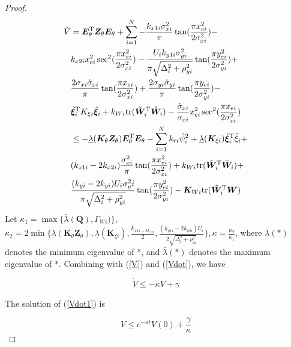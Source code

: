\documentclass[english]{cccconf}
\begin{document}
\begin{proof}
\begin{equation}\label{Vdot}
	\begin{aligned}
		\dot{V}&=\bm{E}^{\rm T}_\theta \bm{Z}_\theta \bm{E}_\theta+\sum^N_{i=1}-\frac{k_{x1i}\sigma^2_{xi}}{\pi}\tan(\frac{\pi x^2_{ei}}{2\sigma^2_{xi}})-\\
		&k_{x2i}x^2_{ei}\sec^2(\frac{\pi x^2_{ei}}{2\sigma^2_{xi}})-\frac{U_ik_{y1i}\sigma^2_{yi}}{\pi\sqrt{\Delta^2_i+\rho^2_{yi}}}\tan(\frac{\pi y^2_{ei}}{2\sigma^2_{yi}})+\\
		&\frac{2\sigma_{xi}\dot{\sigma}_{xi}}{\pi}\tan(\frac{\pi x_{ei}}{2\sigma^2_{xi}})+\frac{2\sigma_{yi}\dot{\sigma}_{yi}}{\pi}\tan(\frac{\pi y_{ei}}{2\sigma^2_{yi}})-\\
		&\tilde{\bm{\xi}}^{\rm T}_iK_{\xi i}\tilde{\bm{\xi}}_i+k_{Wi}{\rm tr}(\tilde{\bm{W}}^{\rm T}_i\hat{\bm{W}}_i)-\frac{\dot{\sigma}_{xi}}{\sigma_{xi}}x^2_{ei}\sec^2(\frac{\pi x_{ei}}{2\sigma^2_{xi}})\\
		&\leq -\underline{\lambda}(\bm{K}_\theta \bm{Z}_\theta)\bm{E}^{\rm T}_\theta \bm{E}_\theta-\sum^N_{i=1}k_{ri}\tilde{\psi}^2_i+\underline{\lambda}(\bm{K}_{\xi i})\tilde{\bm{\xi}}^{\rm T}_i\tilde{\xi}_i+\\
		&(k_{x1i}-2k_{x2i})\frac{\sigma^2_{xi}}{\pi}\tan(\frac{\pi x^2_{ei}}{2\sigma^2_{xi}})+k_{Wi}{\rm tr}(\tilde{\bm{W}}^{\rm T}_i\tilde{\bm{W}}_i)+\\
		&\frac{(k_{yi}-2k_{yi})U_i\sigma^2_yi}{\pi \sqrt{\Delta^2_i+\rho^2_{yi}}}\tan(\frac{\pi y^2_{ei}}{2\sigma^2_{yi}})-\bm{K}_{Wi}{\rm tr}(\tilde{\bm{W}}^{\rm T}_i\bm{W})
	\end{aligned}
\end{equation}
Let $\kappa_1 = \max\{\bar{\lambda}(\bm{Q}),\Gamma_{Wi})\}$, $\kappa_2=2\min\{\underline{\lambda}(\bm{K}_\theta \bm{Z}_\theta),\underline{\lambda}(\bm{K}_{\xi i}),\frac{k_{x1i-2k_{x2i}}}{2},\frac{(k_{y1i}-2k_{y2i})U_i}{2\sqrt{\Delta^2_{i}+\rho^2_{yi}}}\}, \kappa=\frac{\kappa_2}{\kappa_1}$, where $\underline{\lambda}(*)$ denotes the minimum eigenvalue of $*$, and $\bar{\lambda}(*)$ denotes the maximum eigenvalue of $*$. Combining with (\ref{V}) and (\ref{Vdot}), we have

\begin{equation}\label{Vdot1}
	\dot{V}\leq -\kappa V+\gamma
\end{equation}  

The solution of (\ref{Vdot1}) is 

\begin{equation} \label{Vbound}
	V\leq e^{-\kappa t}V(0)+\frac{\gamma}{\kappa}
\end{equation}


\end{proof}
\end{document}
